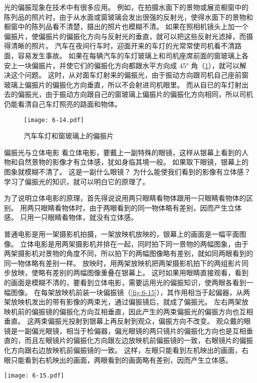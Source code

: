 光的偏振现象在技术中有很多应用。
例如，在拍摄水面下的景物或展览橱窗中的陈列品的照片时，由于从水面或窗玻璃会发出很强的反射光，使得水面下的景物和橱窗中的陈列品看不清楚，摄出的照片也模糊不清。
如果在照相机镜头上加一个偏振片，使偏振片的偏振化方向与反射光的垂直，就可以把这些反射光滤掉，而摄得清晰的照片。
汽车在夜间行车时，迎面开来的车灯的光常常使司机看不清路面，容易发生事故。
如果在每辆汽车的车灯玻璃上和司机座席前面的窗玻璃上各安上一块偏振片，并使它们的偏振化方向都跟水平方向成 \ang{45} 角（\cref{fig:6-14}），就可以解决这个问题。
这时，从对面车灯射来的偏振光，由于振动方向跟司机自己座前窗玻璃上偏振片的偏振化方向垂直，所以不会射进司机眼里。
而从自已的车灯射出去的偏振光，由于振动方向跟自己的窗玻璃上偏振片的偏振化方向相同，所以司机仍能看清自己车灯照亮的路面和物体。

\begin{figure}
  \texttt{[image: 6-14.pdf]}
  \caption{汽车车灯和窗玻璃上的偏振片}\label{fig:6-14}
\end{figure}

\begin{Reading}{偏振光与立体电影}
看立体电影，要戴上一副特殊的眼镜，这样从银幕上看到的人物和自然景物的影像才有立体感，犹如身临其境一般。
如果取下眼镜，银幕上的图象就模糊不清了。
这是一副什么眼镜？
为什么能使我们看到的影像有立体感？
学习了偏振光的知识，就可以明白它的原理了。

为了说明立体电影的原理，首先得说说用两只眼睛看物体跟用一只眼睛看物体的区别。
用两只眼睛看物体时，由于两眼看到的同一物体略有差别，因而产生立体感。
只用一只眼睛看物体，就没有立体感。

普通电影是用一架摄影机拍摄，一架放映机放映的，银幕上的画面是一幅平面图像。
立体电影是用两架摄影机并排在一起，同时拍下同一景物的两幅图象，由于两架摄影机对景物的角度不同，所以拍下的两幅图像略有差别，就如同两眼看到的同一物体略有差别一样。
放映时，用两架放映机把两架摄影机拍下的两组影片同步放映，使略有差别的两幅图像重叠在银幕上。
这时如果用眼睛直接观看，看到的画面是模糊不清的，要看到立体电影，需要运用光的偏振知识，使两眼各看到一幅图像。
在每架放映机前装一块偏振镜（\cref{fig:6-15}），其作用相当于起偏器，从两架放映机发出的带有影像的两束光，通过偏振镜后，就成了偏振光。
左右两架放映机前的偏振镜的偏振化方向互相垂直，因此产生的两束偏振光的偏振方向也互相垂直。
这两束偏振光投射到银幕上再反射到观众，偏振方向不改变。
观众戴的眼镜是一副偏光眼镜，相当于检偏器，偏光眼镜的两只镜片的偏振化方向也是互相垂直的，而且左眼镜片的偏振化方向跟左边放映机前偏振镜的一致，右眼镜片的偏振化方向跟右边放映机前偏振镜的一致。
这样，左眼只能看到左机映出的画面，右眼只能看到右机映出的画面，两眼看到的画面略有差别，因而产生立体感。
\begin{figurehere}
  \begin{minipage}{\linewidth}\centering
  \texttt{[image: 6-15.pdf]}
  \caption{立体电影}\label{fig:6-15}
  \end{minipage}
\end{figurehere}
\end{Reading}

